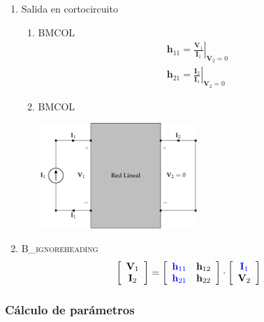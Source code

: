 \begin{enumerate}
\item Salida en cortocircuito
\label{sec:org8fc619b}

\begin{enumerate}
\item \hfill{}\textsc{BMCOL}
\label{sec:orgebc69c6}
\renewcommand{\arraystretch}{2}
\[
  \begin{array}{c}
    \mathbf{h}_{11} = \left.\frac{\mathbf{V}_1}{\mathbf{I}_1}\right\rvert_{\mathbf{V}_2 = 0} \\
    \mathbf{h}_{21} = \left.\frac{\mathbf{I}_2}{\mathbf{I}_1}\right\rvert_{\mathbf{V}_2 = 0}
  \end{array}
\]

\item \hfill{}\textsc{BMCOL}
\label{sec:org3dc9d0b}
\begin{center}
\includegraphics[height=4cm]{../figs/parametrosH_entrada.pdf}
\end{center}
\end{enumerate}

\item \hfill{}\textsc{B\_ignoreheading}
\label{sec:org2feac24}
\[
  \left[
    \begin{array}{c}
      \mathbf{V}_1\\
      \mathbf{I}_2
    \end{array}
  \right] =
  \left[
    \begin{array}{cc}
      \color{blue}{\mathbf{h}_{11}} & \mathbf{h}_{12}\\
      \color{blue}{\mathbf{h}_{21}} & \mathbf{h}_{22}
    \end{array}
  \right] \cdot
  \left[
    \begin{array}{c}
      \color{blue}{\mathbf{I}_1}\\
      \mathbf{V}_2
    \end{array}
  \right]
\]
\end{enumerate}

\subsubsection{Cálculo de parámetros}
\label{sec:org16f02aa}

